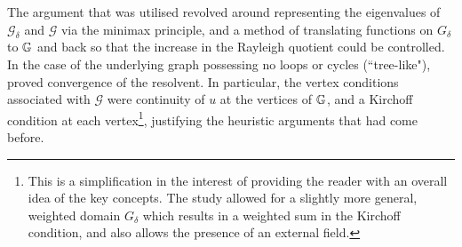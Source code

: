 The argument that was utilised revolved around representing the eigenvalues of $\mathcal{G}_{\delta}$ and $\mathcal{G}$ via the minimax principle, and a method of translating functions on $G_{\delta}$ to $\mathbb{G}$ and back so that the increase in the Rayleigh quotient could be controlled.
In the case of the underlying graph possessing no loops or cycles (``tree-like"), \cite{saito2000limiting} proved convergence of the resolvent.
In particular, the vertex conditions associated with $\mathcal{G}$ were continuity of $u$ at the vertices of $\mathbb{G}$, and a Kirchoff condition at each vertex\footnote{This is a simplification in the interest of providing the reader with an overall idea of the key concepts. The study \cite{kuchment2001convergence} allowed for a slightly more general, weighted domain $G_{\delta}$ which results in a weighted sum in the Kirchoff condition, and also allows the presence of an external field.}, justifying the heuristic arguments that had come before.

